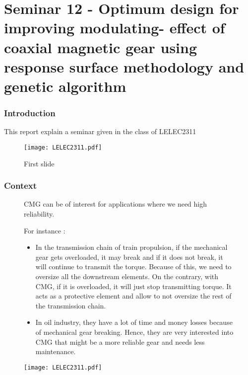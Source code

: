 \part{Seminar 12 - Optimum design for improving modulating-
effect of coaxial magnetic gear using
response surface methodology and genetic
algorithm}


\section{Introduction}

This report explain a seminar given in the class of LELEC2311 
\begin{figure}[H]
\centering
\texttt{[image: LELEC2311.pdf]}
\caption{First slide}
\label{fig:first slide}
\end{figure}

\section{Context}
\begin{figure}[H]
\begin{minipage}{0.45\linewidth}
CMG can be of interest for applications where we need high reliability.

For instance : 
\begin{itemize}
    \item In the transmission chain of train propulsion, if the mechanical gear gets overloaded, it may break and if it does not break, it will continue to transmit the torque. Because of this, we need to oversize all the downstream elements. On the contrary, with CMG, if it is overloaded, it will just stop transmitting torque. It acts as a protective element and allow to not oversize the rest of the transmission chain.
    \item In oil industry, they have a lot of time and money losses because of mechanical gear breaking. Hence, they are very interested into CMG that might be a more reliable gear and needs less maintenance.
\end{itemize}
\end{minipage}
\hfill
\begin{minipage}[c]{0.45\linewidth}
\centering
\texttt{[image: LELEC2311.pdf]}
\label{fig:slide2}
\end{minipage}
\end{figure}

